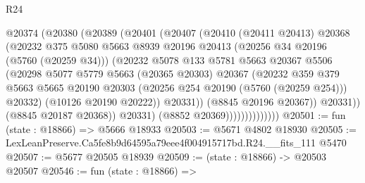 \begin{lexlean}{R24}
\begin{coremodule}
                            @20374
                              (@20380
                                (@20389
                                  (@20401
                                    (@20407
                                      (@20410
                                        (@20411 @20413)
                                        @20368
                                        (@20232
                                          @375
                                          @5080
                                          @5663
                                          @8939
                                          @20196
                                          @20413
                                          (@20256 @34 @20196 (@5760 (@20259 @34)))
                                          (@20232
                                            @5078
                                            @133
                                            @5781
                                            @5663
                                            @20367
                                            @5506
                                            (@20298
                                              @5077
                                              @5779
                                              @5663
                                              (@20365 @20303)
                                              @20367
                                              (@20232
                                                @359
                                                @379
                                                @5663
                                                @5665
                                                @20190
                                                @20303
                                                (@20256 @254 @20190 (@5760 (@20259 @254)))
                                                @20332)
                                              (@10126 @20190 @20222))
                                            @20331))
                                        (@8845 @20196 @20367))
                                      @20331))
                                  (@8845 @20187 @20368))
                                @20331)
                              (@8852 @20369))))))))))))))
@20501 := fun (state : @18866) => @5666 @18933
@20503 := @5671 @4802 @18930
@20505 := LexLeanPreserve.Ca5fe8b9d64595a79eee4f004915717bd.R24.__fits_111 @5470
@20507 := @5677 @20505 @18939
@20509 := (state : @18866) -> @20503 @20507
@20546 := fun (state : @18866) =>

\end{coremodule}
\end{lexlean}
